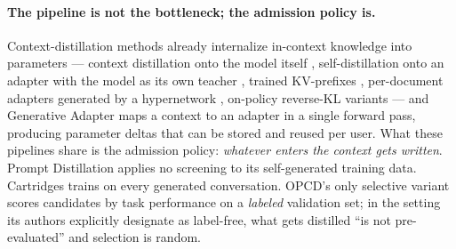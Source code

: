 \documentclass[11pt]{article}
\begin{document}
\paragraph{The pipeline is not the bottleneck; the admission policy is.}
Context-distillation methods already internalize in-context knowledge into parameters ---
context distillation onto the model itself \citep{snell2022distilling},
self-distillation onto an adapter with the model as its own teacher
\citep{kujanpaa2024injection}, trained KV-prefixes \citep{eyuboglu2025cartridges},
per-document adapters generated by a hypernetwork \citep{tan2025dyprag},
on-policy reverse-KL variants \citep{ye2026opcd} --- and Generative Adapter
\citep{chen2024generativeadapter} maps a context to an adapter in a single forward pass,
producing parameter deltas that can be stored and reused per user. What these pipelines
share is the admission policy: \emph{whatever enters the context gets written}. Prompt
Distillation applies no screening to its self-generated training data. Cartridges trains
on every generated conversation. OPCD's only selective variant scores candidates by task
performance on a \emph{labeled} validation set; in the setting its authors explicitly
designate as label-free, what gets distilled ``is not pre-evaluated'' and selection is
random.
\end{document}
